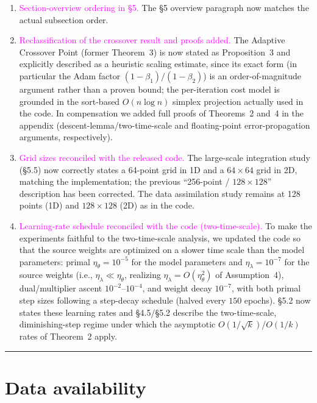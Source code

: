 \documentclass{article}
\newcommand{\audit}[1]{\textcolor{magenta}{#1}}  %
\begin{document}
\begin{enumerate}[leftmargin=*,itemsep=0.4em]
    \item \audit{Section-overview ordering in \S5.} The \S5 overview paragraph
    now matches the actual subsection order.

    \item \audit{Reclassification of the crossover result and proofs added.}
    The Adaptive Crossover Point (former Theorem~3) is now stated as
    Proposition~3 and explicitly described as a heuristic scaling estimate,
    since its exact form (in particular the Adam factor $(1-\beta_1)/(1-\beta_2)$)
    is an order-of-magnitude argument rather than a proven bound; the
    per-iteration cost model is grounded in the sort-based $O(n\log n)$ simplex
    projection actually used in the code. In compensation we added full proofs
    of Theorems~2 and~4 in the appendix (descent-lemma/two-time-scale and
    floating-point error-propagation arguments, respectively).

    \item \audit{Grid sizes reconciled with the released code.} The large-scale
    integration study (\S5.5) now correctly states a 64-point grid in 1D and a
    $64\times64$ grid in 2D, matching the implementation; the previous
    ``256-point / $128\times128$'' description has been corrected. The data
    assimilation study remains at 128 points (1D) and $128\times128$ (2D) as in
    the code.

    \item \audit{Learning-rate schedule reconciled with the code (two-time-scale).}
    To make the experiments faithful to the two-time-scale analysis, we updated
    the code so that the source weights are optimized on a slower time scale than
    the model parameters: primal $\eta_\theta=10^{-5}$ for the model parameters and
    $\eta_\lambda=10^{-7}$ for the source weights (i.e., $\eta_\lambda \ll \eta_\theta$,
    realizing $\eta_\lambda=O(\eta_\theta^2)$ of Assumption~4), dual/multiplier
    ascent $10^{-2}$--$10^{-4}$, and weight decay $10^{-7}$, with both primal step
    sizes following a step-decay schedule (halved every $150$ epochs). \S5.2 now
    states these learning rates and \S4.5/\S5.2 describe the two-time-scale,
    diminishing-step regime under which the asymptotic $O(1/\sqrt{k})$/$O(1/k)$
    rates of Theorem~2 apply.
\end{enumerate}

\bigskip
\hrule
\bigskip

\section*{Data availability}
\end{document}

